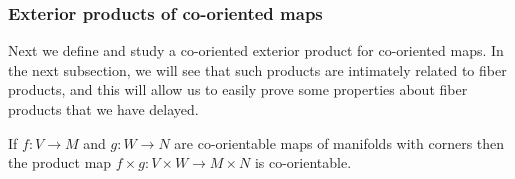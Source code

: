 \subsubsection{Exterior products of co-oriented maps}

Next we define and study a co-oriented exterior product for co-oriented maps.
In the next subsection, we will see that such products are intimately related to fiber products, and this will allow us to easily prove some properties about fiber products that we have delayed.

\begin{comment}
Before getting to co-orientations, we first show that a product of proper maps is proper.

\begin{lemma}\label{L: proper product}
	If $f \colon V \to M$ and $g \colon W \to N$ are proper maps of spaces then the product map $f \times g \colon V \times W \to M \times N$ is proper.
\end{lemma}

\begin{proof}
	Let $\pi_M,\pi_N$ be the projections of $M \times N$ to $M$ and $N$, and similarly for $\pi_V, \pi_W$.
	Let $K$ be a compact subspace of $M \times N$.
	Then $\pi_M(K)$ and $\pi_N(K)$ are compact, and hence so is $\pi_M(K) \times \pi_N(K) \subset M \times N$, and this set contains $K$.
	So
	$$(f \times g)^{-1}(K) \subset (f \times g)^{-1}(\pi_M(K) \times \pi_N(K)) = f^{-1}(\pi_M(K)) \times g^{-1}(\pi_N(K)).$$
	But now $f^{-1}(\pi_M(K))$ and $g^{-1}(\pi_N(K))$ are compact as $f$ and $g$ are proper and so $(f \times g)^{-1}(K)$ is a closed subset of a compact set, hence compact.
\end{proof}

\end{comment}

\begin{lemma}
	If $f \colon V \to M$ and $g \colon W \to N$ are co-orientable maps of manifolds with corners then the product map $f \times g \colon V \times W \to M \times N$ is co-orientable.
\end{lemma}

